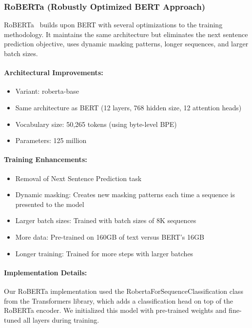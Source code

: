 \documentclass[12pt]{article}
\begin{document}
\subsubsection{RoBERTa (Robustly Optimized BERT Approach)}
RoBERTa~\cite{liu2019roberta} builds upon BERT with several optimizations to the training methodology. It maintains the same architecture but eliminates the next sentence prediction objective, uses dynamic masking patterns, longer sequences, and larger batch sizes.

\paragraph{Architectural Improvements:}
\begin{itemize}
    \item Variant: roberta-base
    \item Same architecture as BERT (12 layers, 768 hidden size, 12 attention heads)
    \item Vocabulary size: 50,265 tokens (using byte-level BPE)
    \item Parameters: 125 million
\end{itemize}

\paragraph{Training Enhancements:}
\begin{itemize}
    \item Removal of Next Sentence Prediction task
    \item Dynamic masking: Creates new masking patterns each time a sequence is presented to the model
    \item Larger batch sizes: Trained with batch sizes of 8K sequences
    \item More data: Pre-trained on 160GB of text versus BERT's 16GB
    \item Longer training: Trained for more steps with larger batches
\end{itemize}

\paragraph{Implementation Details:}
Our RoBERTa implementation used the RobertaForSequenceClassification class from the Transformers library, which adds a classification head on top of the RoBERTa encoder. We initialized this model with pre-trained weights and fine-tuned all layers during training.
\end{document}
